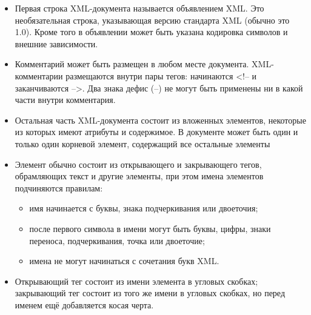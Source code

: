 \documentclass[12pt,a4paper,oneside]{article} %
\begin{document}
\begin{itemize}
\item Первая строка XML-документа называется объявлением XML. \linebreak
Это необязательная строка, указывающая версию стандарта XML \linebreak
(обычно это 1.0). Кроме того в объявлении может быть указана \linebreak
кодировка символов и внешние зависимости.

\item	Комментарий может быть размещен в любом месте документа. \linebreak
XML-комментарии размещаются внутри пары тегов: начинаются \linebreak
<!-- и заканчиваются -->. Два знака дефис (--) не могут быть \linebreak
применены ни в какой части внутри комментария.

\item	Остальная часть XML-документа состоит из вложенных \linebreak
элементов, некоторые из которых имеют атрибуты и содержимое. \linebreak
В документе может быть один и только один корневой элемент, \linebreak
содержащий все остальные элементы

\item	Элемент обычно состоит из открывающего и закрывающего \linebreak
тегов, обрамляющих текст и другие элементы, при этом имена \linebreak
элементов подчиняются правилам:

\begin{itemize}
\item имя начинается с буквы, знака подчеркивания или двоеточия;
\item	после первого символа в имени могут быть буквы, цифры, знаки\linebreak
переноса, подчеркивания, точка или двоеточие;
\item	имена не могут начинаться с сочетания букв XML.
\end{itemize}

\item	Открывающий тег состоит из имени элемента в угловых \linebreak
скобках; закрывающий тег состоит из того же имени в угловых \linebreak
скобках, но перед именем ещё добавляется косая черта.


\end{itemize}
\end{document}
